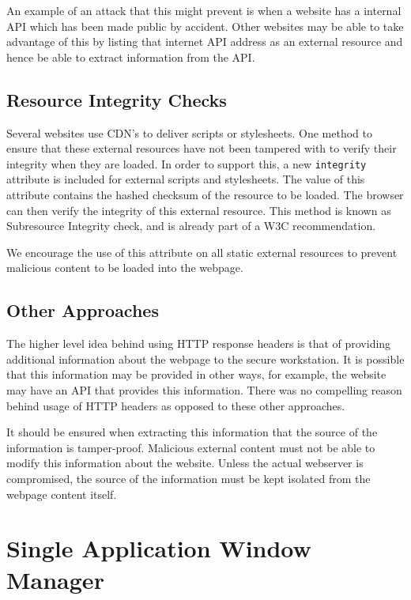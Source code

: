An example of an attack that this might prevent is when a website has a internal API which has been made public by accident. Other websites may be able to take advantage of this by listing that internet API address as an external resource and hence be able to extract information from the API.

\subsection{Resource Integrity Checks}

Several websites use CDN's to deliver scripts or stylesheets. One method to ensure that these external resources have not been tampered with to verify their integrity when they are loaded. In order to support this, a new \texttt{integrity} attribute is included for external scripts and stylesheets. The value of this attribute contains the hashed checksum of the resource to be loaded. The browser can then verify the integrity of this external resource. This method is known as Subresource Integrity \cite{subresource-integrity} \cite{subresource-integrity-2} check, and is already part of a W3C recommendation.

We encourage the use of this attribute on all static external resources to prevent malicious content to be loaded into the webpage.

\subsection{Other Approaches}

The higher level idea behind using HTTP response headers is that of providing additional information about the webpage to the secure workstation. It is possible that this information may be provided in other ways, for example, the website may have an API that provides this information. There was no compelling reason behind usage of HTTP headers as opposed to these other approaches.

It should be ensured when extracting this information that the source of the information is tamper-proof. Malicious external content must not be able to modify this information about the website. Unless the actual webserver is compromised, the source of the information must be kept isolated from the webpage content itself.

\section{Single Application Window Manager}

